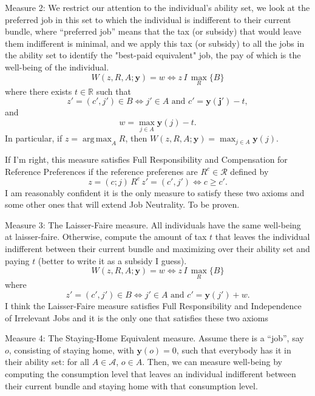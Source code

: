 \documentclass[12pt,thmsb]{article}
\DeclareMathOperator*{\argmax}{arg\,max}
\begin{document}
Measure 2: We restrict our attention to the individual's ability set, we look at the preferred job in this set to which the individual is indifferent to their current bundle, where ``preferred job'' means that the tax (or subsidy) that would leave them indifferent is minimal, and we apply this tax (or subsidy) to all the jobs in the ability set to identify the "best-paid equivalent" job, the pay of which is the well-being of the individual.
\begin{equation*}
\label{ }
W(z, R, A;\mathbf{y})=w\Leftrightarrow z\,I\,\max_R\{B\}
\end{equation*}
where there exists $t\in\mathbb{R}$ such that 
\begin{equation*}
\label{ }
z'=(c',j')\in B\Leftrightarrow j'\in A \textrm{ and } c'=\mathbf{y(j')}-t,
\end{equation*}
and 
\begin{equation*}
\label{ }
w=\max_{j\in A}\mathbf{y}(j)-t.
\end{equation*}
In particular, if $z=\argmax_A R$, then $W(z, R, A;\mathbf{y})=\max_{j\in A}\mathbf{y}(j)$.

If I'm right, this measure satisfies Full Responsibility and Compensation for Reference Preferences if the reference preferenes are $R^{c}\in\mathcal{R}$ defined by 
\begin{equation*}
\label{ }
z=(c;j)\,R^{c}\,z'=(c',j')\Leftrightarrow c\geq c'.
\end{equation*} 
I am reasonably confident it is the only measure to satisfy these two axioms and some other ones that will extend Job Neutrality. To be proven.

Measure 3: The Laisser-Faire measure. All individuals have the same well-being at laisser-faire. Otherwise, compute the amount of tax $t$ that leaves the individual indifferent between their current bundle and maximizing over their ability set and paying $t$ (better to write it as a subsidy I guess).
\begin{equation*}
\label{ }
W(z, R, A;\mathbf{y})=w\Leftrightarrow z\,I\,\max_R\{B\}
\end{equation*}
where 
\begin{equation*}
\label{ }
z'=(c',j')\in B\Leftrightarrow j'\in A \textrm{ and } c'=\mathbf{y}(j')+w.
\end{equation*}
I think the Laisser-Faire measure satisfies Full Responsibility and Independence of Irrelevant Jobs and it is the only one that satisfies these two axioms

Measure 4: The Staying-Home Equivalent measure. Assume there is a ``job'', say $o$, consisting of staying home, with $\mathbf{y}(o)=0$, such that everybody has it in their ability set: for all $A\in\mathcal{A}$, $o\in A$. Then, we can measure well-being by computing the consumption level that leaves an individual indifferent between their current bundle and staying home with that consumption level.
\end{document}
